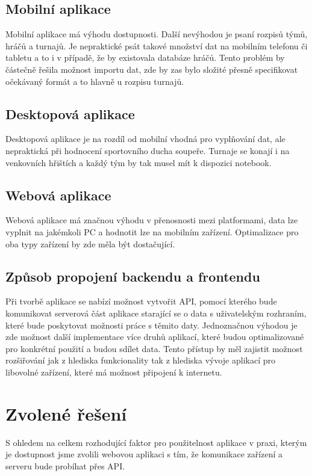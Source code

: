\documentclass[thesis=B,czech]{FITthesis}[2012/06/26]
\begin{document}
	\subsection{Mobilní aplikace}
	Mobilní aplikace má výhodu dostupnosti. Další nevýhodou je psaní rozpisů týmů, hráčů a turnajů. Je nepraktické psát takové množství dat na mobilním telefonu či tabletu a to i v případě, že by existovala databáze hráčů. Tento problém by částečně řešila možnost importu dat, zde by zas bylo složité přesně specifikovat očekávaný formát a to hlavně u rozpisu turnajů.
	
	\subsection{Desktopová aplikace}
	Desktopová aplikace je na rozdíl od mobilní vhodná pro vyplňování dat, ale nepraktická při hodnocení sportovního ducha soupeře. Turnaje se konají i na venkovních hřištích a každý tým by tak musel mít k dispozici notebook.
	
	\subsection{Webová aplikace}
	Webová aplikace má značnou výhodu v přenosnosti mezi platformami, data lze vyplnit na jakémkoli PC a hodnotit lze na mobilním zařízení. Optimalizace pro oba typy zařízení by zde měla být dostačující.
	
	\subsection{Způsob propojení backendu a frontendu}
	Při tvorbě aplikace se nabízí možnost vytvořit API, pomocí kterého bude komunikovat serverová část aplikace starající se o data s uživatelským rozhraním, které bude poskytovat možnosti práce s těmito daty. Jednoznačnou výhodou je zde možnost další implementace více druhů aplikací, které budou optimalizované pro konkrétní použití a budou sdílet data. Tento přístup by měl zajistit možnost rozšiřování jak z hlediska funkcionality tak z hlediska vývoje aplikací pro libovolné zařízení, které má možnost připojení k internetu.
		
\section{Zvolené řešení}
	S ohledem na celkem rozhodující faktor pro použitelnost aplikace v praxi, kterým je dostupnost jsme zvolili webovou aplikaci s tím, že komunikace zařízení a serveru bude probíhat přes API. 
	
\end{document}
